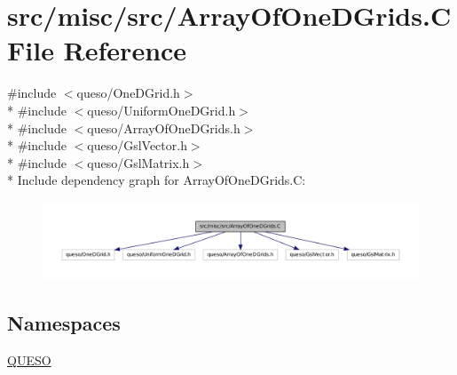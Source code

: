 \hypertarget{_array_of_one_d_grids_8_c}{\section{src/misc/src/\-Array\-Of\-One\-D\-Grids.C File Reference}
\label{_array_of_one_d_grids_8_c}
}
{\ttfamily \#include $<$queso/\-One\-D\-Grid.\-h$>$}\\*
{\ttfamily \#include $<$queso/\-Uniform\-One\-D\-Grid.\-h$>$}\\*
{\ttfamily \#include $<$queso/\-Array\-Of\-One\-D\-Grids.\-h$>$}\\*
{\ttfamily \#include $<$queso/\-Gsl\-Vector.\-h$>$}\\*
{\ttfamily \#include $<$queso/\-Gsl\-Matrix.\-h$>$}\\*
Include dependency graph for Array\-Of\-One\-D\-Grids.\-C\-:
\nopagebreak
\begin{figure}[H]
\begin{center}
\leavevmode
\includegraphics[width=350pt]{_array_of_one_d_grids_8_c__incl}
\end{center}
\end{figure}
\subsection*{Namespaces}
\begin{DoxyCompactItemize}
\item 
\hyperlink{namespace_q_u_e_s_o}{Q\-U\-E\-S\-O}
\end{DoxyCompactItemize}
